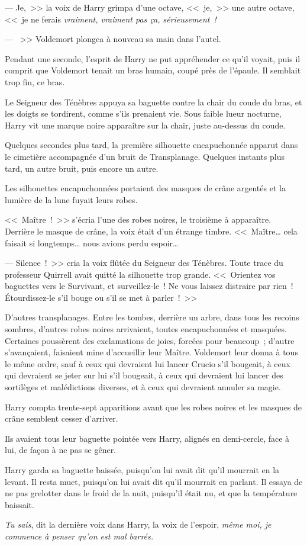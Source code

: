 --- Je,~>> la voix de Harry grimpa d'une octave, <<~je,~>> une autre octave, <<~je ne ferais \emph{vraiment, vraiment pas ça, sérieusement~!}

--- ~>> Voldemort plongea à nouveau sa main dans l'autel.

Pendant une seconde, l'esprit de Harry ne put appréhender ce qu'il voyait, puis il comprit que Voldemort tenait un bras humain, coupé près de l'épaule. Il semblait trop fin, ce bras.

Le Seigneur des Ténèbres appuya sa baguette contre la chair du coude du bras, et les doigts se tordirent, comme s'ils prenaient vie. Sous faible lueur nocturne, Harry vit une marque noire apparaître sur la chair, juste au-dessus du coude.

Quelques secondes plus tard, la première silhouette encapuchonnée apparut dans le cimetière accompagnée d'un bruit de Transplanage. Quelques instants plus tard, un autre bruit, puis encore un autre.

Les silhouettes encapuchonnées portaient des masques de crâne argentés et la lumière de la lune fuyait leurs robes.

<<~Maître~!~>> s'écria l'une des robes noires, le troisième à apparaître. Derrière le masque de crâne, la voix était d'un étrange timbre. <<~Maître… cela faisait si longtemps… nous avions perdu espoir…

--- Silence~!~>> cria la voix flûtée du Seigneur des Ténèbres. Toute trace du professeur Quirrell avait quitté la silhouette trop grande. <<~Orientez vos baguettes vers le Survivant, et surveillez-le~! Ne vous laissez distraire par rien~! Étourdissez-le s'il bouge ou s'il se met à parler~!~>>

D'autres transplanages. Entre les tombes, derrière un arbre, dans tous les recoins sombres, d'autres robes noires arrivaient, toutes encapuchonnées et masquées. Certaines poussèrent des exclamations de joies, forcées pour beaucoup~; d'autre s'avançaient, faisaient mine d'accueillir leur Maître. Voldemort leur donna à tous le même ordre, sauf à ceux qui devraient lui lancer Crucio s'il bougeait, à ceux qui devraient se jeter sur lui s'il bougeait, à ceux qui devraient lui lancer des sortilèges et malédictions diverses, et à ceux qui devraient annuler sa magie.

Harry compta trente-sept apparitions avant que les robes noires et les masques de crâne semblent cesser d'arriver.

Ils avaient tous leur baguette pointée vers Harry, alignés en demi-cercle, face à lui, de façon à ne pas se gêner.

Harry garda sa baguette baissée, puisqu'on lui avait dit qu'il mourrait en la levant. Il resta muet, puisqu'on lui avait dit qu'il mourrait en parlant. Il essaya de ne pas grelotter dans le froid de la nuit, puisqu'il était nu, et que la température baissait.

\emph{Tu sais}, dit la dernière voix dans Harry, la voix de l'espoir, \emph{même moi, je commence à penser qu'on est mal barrés.}
